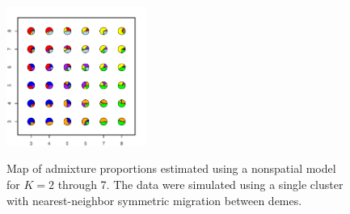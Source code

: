 \documentclass[12pt]{article}
\begin{document}
\begin{figure}
			{\includegraphics[width=1.8in,height=1.8in]{figs/sims/simK1_nsp_pies_K7.pdf}}
	\caption{
	Map of admixture proportions estimated using a nonspatial model for $K=2$ through 7.
	The data were simulated using a single cluster with nearest-neighbor symmetric migration between demes.
    }\label{simK1_nsp_pies}
\end{figure}
\end{document}
